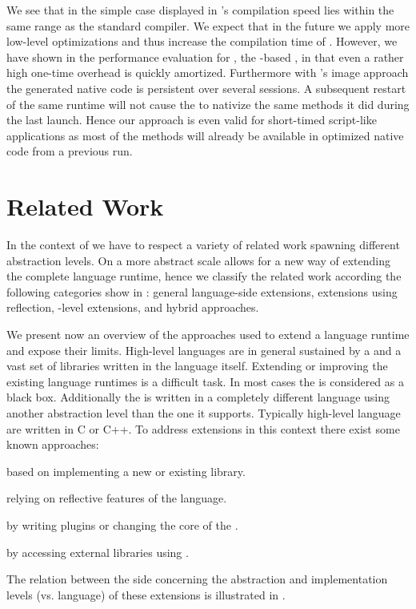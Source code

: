We see that in the simple case displayed in  \NBJ's compilation speed lies within the same range as the standard \PH compiler.
We expect that in the future we apply more low-level optimizations and thus increase the compilation time of \NBJ.
However, we have shown in the performance evaluation for \NB, the \B-based \FFI, in  that even a rather high one-time overhead is quickly amortized.
Furthermore with \PH's image approach the generated native code is persistent over several sessions.
A subsequent restart of the same runtime will not cause the \JIT to nativize the same methods it did during the last launch.
Hence our approach is even valid for short-timed script-like applications as most of the methods will already be available in optimized native code from a previous run.


\section{Related Work}
In the context of \B we have to respect a variety of related work spawning different abstraction levels.
On a more abstract scale \B allows for a new way of extending the complete language runtime, hence we classify the related work according the following categories show in : general language-side extensions, extensions using reflection, \VM-level extensions, and hybrid approaches.

We present now an overview of the approaches used to extend a language runtime and expose their limits.
High-level languages are in general sustained by a \VM and a vast set of libraries written in the language itself. 
Extending or improving the existing language runtimes is a difficult task.
In most cases the \VM is considered as a black box.
Additionally the \VM is written in a completely different language using another abstraction level than the one it supports.
Typically high-level language \VMs are written in C or C++.
To address extensions in this context there exist some known approaches:

\begin{description}[noitemsep]
	\item[Language-side Library] based on implementing a new or existing library. 
	\item[Reflective Extension] relying on reflective features of the language. 
	\item[\VM Extension] by writing plugins or changing the core of the \VM.
	\item[Hybrid Extension] by accessing external libraries using \FFI.  
\end{description}
%
The relation between the side concerning the abstraction and implementation levels (\VM vs. language) of these extensions is illustrated in .

